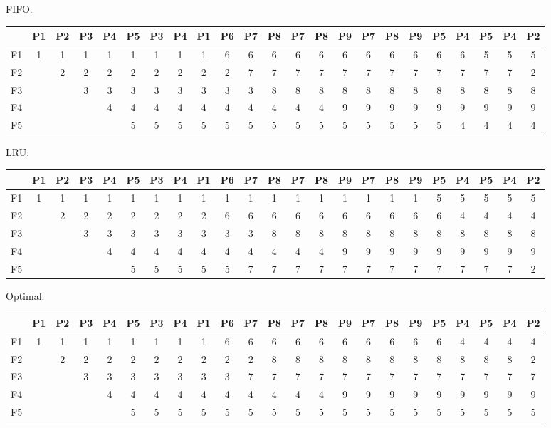 \begin{latin}
    FIFO:
    {
    \scriptsize
    \center
    \begin{tabular}{c|c|c|c|c|c|c|c|c|c|c|c|c|c|c|c|c|c|c|c|c|c|c}
        & P1 & P2 & P3 & P4 & P5 & P3 & P4 & P1 & P6 & P7 & P8 & P7 & P8 & P9 & P7 & P8 & P9 & P5 & P4 & P5 & P4 & P2\\
        \hline
        F1 & 1 & 1 & 1 & 1 & 1 & 1 & 1 & 1 & 6 & 6 & 6 & 6 & 6 & 6 & 6 & 6 & 6 & 6 & 6 & 5 & 5 & 5\\
        F2 &   & 2 & 2 & 2 & 2 & 2 & 2 & 2 & 2 & 7 & 7 & 7 & 7 & 7 & 7 & 7 & 7 & 7 & 7 & 7 & 7 & 2\\
        F3 &   &   & 3 & 3 & 3 & 3 & 3 & 3 & 3 & 3 & 8 & 8 & 8 & 8 & 8 & 8 & 8 & 8 & 8 & 8 & 8 & 8\\
        F4 &   &   &   & 4 & 4 & 4 & 4 & 4 & 4 & 4 & 4 & 4 & 4 & 9 & 9 & 9 & 9 & 9 & 9 & 9 & 9 & 9\\
        F5 &   &   &   &   & 5 & 5 & 5 & 5 & 5 & 5 & 5 & 5 & 5 & 5 & 5 & 5 & 5 & 5 & 4 & 4 & 4 & 4
    \end{tabular}
    }
    LRU:
    {
    \scriptsize
    \center
    \begin{tabular}{c|c|c|c|c|c|c|c|c|c|c|c|c|c|c|c|c|c|c|c|c|c|c}
        & P1 & P2 & P3 & P4 & P5 & P3 & P4 & P1 & P6 & P7 & P8 & P7 & P8 & P9 & P7 & P8 & P9 & P5 & P4 & P5 & P4 & P2\\
        \hline
        F1 & 1 & 1 & 1 & 1 & 1 & 1 & 1 & 1 & 1 & 1 & 1 & 1 & 1 & 1 & 1 & 1 & 1 & 5 & 5 & 5 & 5 & 5 \\
        F2 &   & 2 & 2 & 2 & 2 & 2 & 2 & 2 & 6 & 6 & 6 & 6 & 6 & 6 & 6 & 6 & 6 & 6 & 4 & 4 & 4 & 4 \\
        F3 &   &   & 3 & 3 & 3 & 3 & 3 & 3 & 3 & 3 & 8 & 8 & 8 & 8 & 8 & 8 & 8 & 8 & 8 & 8 & 8 & 8 \\
        F4 &   &   &   & 4 & 4 & 4 & 4 & 4 & 4 & 4 & 4 & 4 & 4 & 9 & 9 & 9 & 9 & 9 & 9 & 9 & 9 & 9 \\
        F5 &   &   &   &   & 5 & 5 & 5 & 5 & 5 & 7 & 7 & 7 & 7 & 7 & 7 & 7 & 7 & 7 & 7 & 7 & 7 & 2 
    \end{tabular}
    }
    Optimal:
    {
    \scriptsize
    \center
    \begin{tabular}{c|c|c|c|c|c|c|c|c|c|c|c|c|c|c|c|c|c|c|c|c|c|c}
        & P1 & P2 & P3 & P4 & P5 & P3 & P4 & P1 & P6 & P7 & P8 & P7 & P8 & P9 & P7 & P8 & P9 & P5 & P4 & P5 & P4 & P2\\
        \hline
        F1 & 1 & 1 & 1 & 1 & 1 & 1 & 1 & 1 & 6 & 6 & 6 & 6 & 6 & 6 & 6 & 6 & 6 & 6 & 4 & 4 & 4 & 4 \\
        F2 &   & 2 & 2 & 2 & 2 & 2 & 2 & 2 & 2 & 2 & 8 & 8 & 8 & 8 & 8 & 8 & 8 & 8 & 8 & 8 & 8 & 2 \\
        F3 &   &   & 3 & 3 & 3 & 3 & 3 & 3 & 3 & 7 & 7 & 7 & 7 & 7 & 7 & 7 & 7 & 7 & 7 & 7 & 7 & 7 \\
        F4 &   &   &   & 4 & 4 & 4 & 4 & 4 & 4 & 4 & 4 & 4 & 4 & 9 & 9 & 9 & 9 & 9 & 9 & 9 & 9 & 9 \\
        F5 &   &   &   &   & 5 & 5 & 5 & 5 & 5 & 5 & 5 & 5 & 5 & 5 & 5 & 5 & 5 & 5 & 5 & 5 & 5 & 5 
    \end{tabular}
    }
\end{latin}